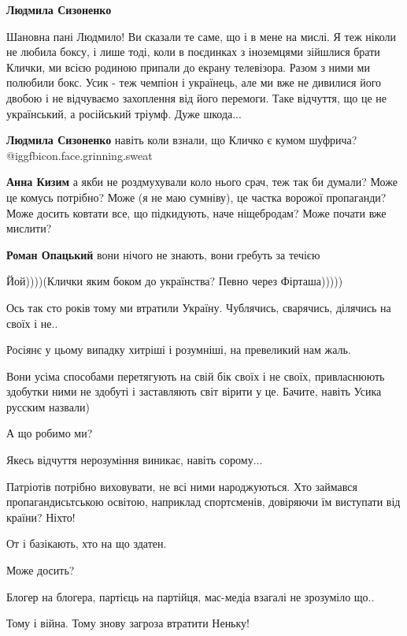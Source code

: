 \begin{itemize}
\begin{itemize} %
\textbf{Людмила Сизоненко} 

Шановна пані Людмило! Ви сказали те саме, що і в мене на мислі. Я теж ніколи не
любила боксу, і лише тоді, коли в поєдинках з іноземцями зійшлися брати Клички,
ми всією родиною припали до екрану телевізора. Разом з ними ми полюбили бокс.
Усик - теж чемпіон і українець, але ми вже не дивилися його двобою і не
відчуваємо захоплення від його перемоги. Таке відчуття, що це не український, а
російський тріумф. Дуже шкода...


\textbf{Людмила Сизоненко} навіть коли взнали, що Кличко є кумом шуфрича? @igg{fbicon.face.grinning.sweat} 

\textbf{Анна Кизим} а якби не роздмухували коло нього срач, теж так би думали? Може це комусь потрібно? Може (я не маю сумніву), це частка ворожої пропаганди? Може досить ковтати все, що підкидують, наче ніщебродам?
Може почати вже мислити?

\textbf{Роман Опацький} вони нічого не знають, вони гребуть за течією

Йой))))(Клички яким боком до українства? Певно через Фірташа)))))
\end{itemize} %


Ось так сто років тому ми втратили Україну. Чублячись, сварячись, ділячись на
своїх і не..

Росіянє у цьому випадку хитріші і розумніші, на превеликий нам жаль.

Вони усіма способами перетягують на свій бік своїх і не своїх, привласнюють
здобутки ними не здобуті і заставляють світ вірити у це. Бачите, навіть Усика
русским назвали)

А що робимо ми?

Якесь відчуття нерозуміння виникає, навіть сорому...

Патріотів потрібно виховувати, не всі ними народжуються. Хто займався
пропагандисьтською освітою, наприклад спортсменів, довіряючи їм виступати від
країни? Ніхто!

От і базікають, хто на що здатен.

Може досить?

Блогер на блогера, партієць на партійця, мас-медіа взагалі не зрозуміло що..

Тому і війна. Тому знову загроза втратити Неньку!


\end{itemize}
